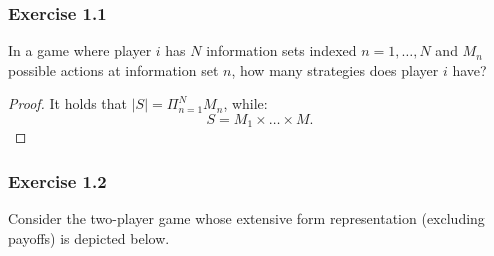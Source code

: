 \documentclass[12pt]{extreport} %
\theoremstyle{named}
\theoremstyle{itshape}
\theoremstyle{normal}
\begin{document}
\subsubsection*{Exercise 1.1}

In a game where player $i$ has $N$ information sets indexed $n = 1, \dotsc, N$ and $M_n$ possible actions at information set $n$, how many strategies does player $i$ have?

	\begin{proof}
		It holds that $|S| = \Pi_{n=1}^{N} M_{n}$, while:
		$$ S = M_{1} \times \dots \times M. $$
	\end{proof}

\subsubsection*{Exercise 1.2}	
	Consider the two-player game whose extensive form representation (excluding payoffs) is depicted below.
\end{document}
